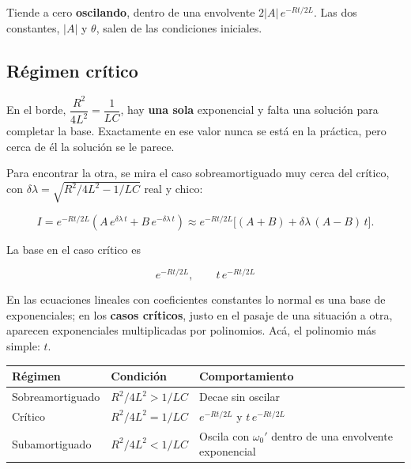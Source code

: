 \documentclass[12pt,a4paper]{article}
\begin{document}
Tiende a cero \textbf{oscilando}, dentro de una envolvente $2|A|\,e^{-Rt/2L}$. Las
dos constantes, $|A|$ y $\theta$, salen de las condiciones iniciales.

\subsection{Régimen crítico}

En el borde, $\dfrac{R^2}{4L^2} = \dfrac{1}{LC}$, hay \textbf{una sola} exponencial
y falta una solución para completar la base. Exactamente en ese valor nunca se
está en la práctica, pero cerca de él la solución se le parece.

Para encontrar la otra, se mira el caso sobreamortiguado muy cerca del
crítico, con $\delta\lambda = \sqrt{R^2/4L^2 - 1/LC}$ real y chico:

\[
I = e^{-Rt/2L}\left(A\,e^{\delta\lambda\,t} + B\,e^{-\delta\lambda\,t}\right)
\approx e^{-Rt/2L}\Big[(A+B) + \delta\lambda\,(A-B)\,t\Big].
\]

La base en el caso crítico es

\begin{keybox}
\[
\boxed{\ e^{-Rt/2L},\qquad t\,e^{-Rt/2L}\ }
\]
\end{keybox}

\begin{notebox}
En las ecuaciones lineales con coeficientes constantes
lo normal es una base de exponenciales; en los \textbf{casos críticos}, justo en el
pasaje de una situación a otra, aparecen exponenciales multiplicadas por
polinomios. Acá, el polinomio más simple: $t$.
\end{notebox}

\begin{center}
\renewcommand{\arraystretch}{1.35}
\small
\begin{tabularx}{\textwidth}{l>{\raggedright\arraybackslash}X>{\raggedright\arraybackslash}X}
\toprule
\textbf{Régimen} & \textbf{Condición} & \textbf{Comportamiento} \\
\midrule
Sobreamortiguado & $R^2/4L^2 > 1/LC$ & Decae sin oscilar \\
Crítico & $R^2/4L^2 = 1/LC$ & $e^{-Rt/2L}$ y $t\,e^{-Rt/2L}$ \\
Subamortiguado & $R^2/4L^2 < 1/LC$ & Oscila con $\omega_0'$ dentro de una envolvente exponencial \\
\bottomrule
\end{tabularx}
\end{center}
\end{document}
